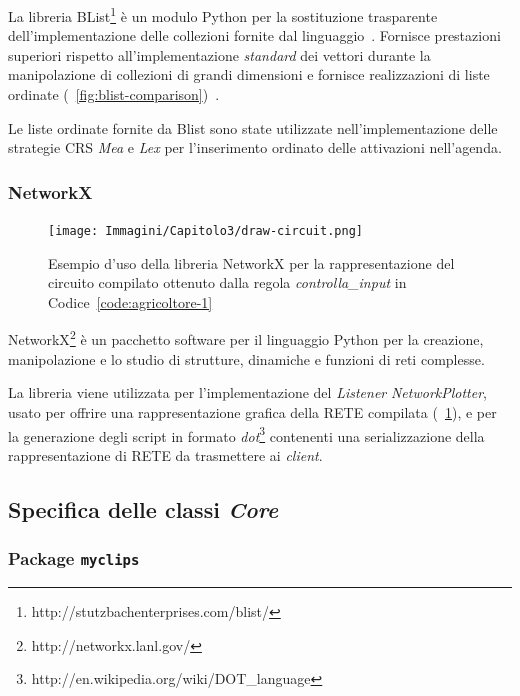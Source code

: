 La libreria BList\footnote{http://stutzbachenterprises.com/blist/} è un modulo Python per la sostituzione trasparente dell'implementazione delle collezioni fornite dal linguaggio~\cite{blist-manual}. Fornisce prestazioni superiori rispetto all'implementazione \emph{standard} dei vettori durante la manipolazione di collezioni di grandi dimensioni e fornisce realizzazioni di liste ordinate (\figurename~\ref{fig:blist-comparison})~\cite{blist-prest}.

Le liste ordinate fornite da Blist sono state utilizzate nell'implementazione delle strategie CRS \emph{Mea} e \emph{Lex} per l'inserimento ordinato delle attivazioni nell'agenda.


\subsubsection{NetworkX}

\begin{figure}
\centering
\texttt{[image: Immagini/Capitolo3/draw-circuit.png]}
\caption[Esempio d'uso della libreria NetworkX]{Esempio d'uso della libreria NetworkX per la rappresentazione del circuito compilato ottenuto dalla regola \emph{controlla\_input} in Codice~\ref{code:agricoltore-1}}\label{fig:networkx-example}
\end{figure}

NetworkX\footnote{http://networkx.lanl.gov/} è un pacchetto software per il linguaggio Python per la creazione, manipolazione e lo studio di strutture, dinamiche e funzioni di reti complesse.

La libreria viene utilizzata per l'implementazione del \emph{Listener} \emph{NetworkPlotter}, usato per offrire una rappresentazione grafica della RETE compilata (\figurename~\ref{fig:networkx-example}), e per la generazione degli script in formato \emph{dot}\footnote{http://en.wikipedia.org/wiki/DOT\_language} contenenti una serializzazione della rappresentazione di RETE da trasmettere ai \emph{client}.

\subsection{Specifica delle classi \emph{Core}}


\subsubsection{Package \texttt{myclips}}

